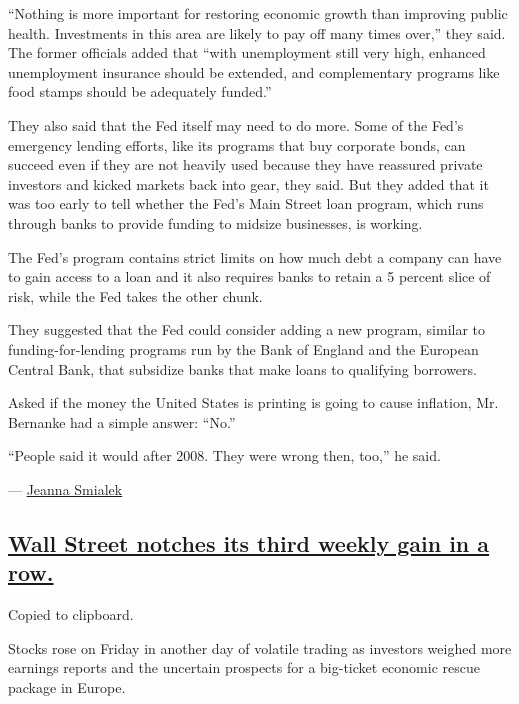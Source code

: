``Nothing is more important for restoring economic growth than improving
public health. Investments in this area are likely to pay off many times
over,'' they said. The former officials added that ``with unemployment
still very high, enhanced unemployment insurance should be extended, and
complementary programs like food stamps should be adequately funded.''

They also said that the Fed itself may need to do more. Some of the
Fed's emergency lending efforts, like its programs that buy corporate
bonds, can succeed even if they are not heavily used because they have
reassured private investors and kicked markets back into gear, they
said. But they added that it was too early to tell whether the Fed's
Main Street loan program, which runs through banks to provide funding to
midsize businesses, is working.

The Fed's program contains strict limits on how much debt a company can
have to gain access to a loan and it also requires banks to retain a 5
percent slice of risk, while the Fed takes the other chunk.

They suggested that the Fed could consider adding a new program, similar
to funding-for-lending programs run by the Bank of England and the
European Central Bank, that subsidize banks that make loans to
qualifying borrowers.

Asked if the money the United States is printing is going to cause
inflation, Mr. Bernanke had a simple answer: ``No.''

``People said it would after 2008. They were wrong then, too,'' he said.

--- \href{https://www.nytimes.com/by/jeanna-smialek}{Jeanna Smialek}

\hypertarget{wall-street-notches-its-third-weekly-gain-in-a-row}{%
\subsection{\texorpdfstring{\protect\hyperlink{wall-street-notches-its-third-weekly-gain-in-a-row}{Wall
Street notches its third weekly gain in a
row.}}{Wall Street notches its third weekly gain in a row.}}\label{wall-street-notches-its-third-weekly-gain-in-a-row}}

Copied to clipboard.

Stocks rose on Friday in another day of volatile trading as investors
weighed more earnings reports and the uncertain prospects for a
big-ticket economic rescue package in Europe.

